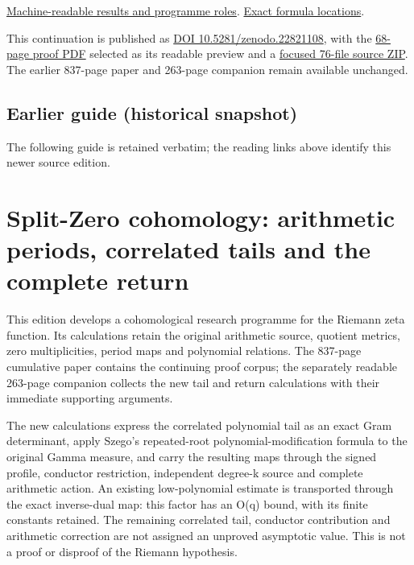 \documentclass[
]{article}
\begin{document}
\href{https://github.com/KokunoYumeto/zeta-function-research-reader/blob/main/workbenches/splitzero-tandem/continuations/20260918-conductor-covariance-attained-profile/research_index/PROGRAM_INDEX.json}{Machine-readable
results and programme roles}.
\href{https://github.com/KokunoYumeto/zeta-function-research-reader/blob/main/workbenches/splitzero-tandem/continuations/20260918-conductor-covariance-attained-profile/research_index/FORMULA_LOCATORS.json}{Exact
formula locations}.

This continuation is published as
\href{https://zenodo.org/records/22821108}{DOI 10.5281/zenodo.22821108},
with the
\href{https://zenodo.org/records/22821108/preview/95-splitzero-conductor-covariance-proof.pdf?include_deleted=0}{68-page
proof PDF} selected as its readable preview and a
\href{https://zenodo.org/api/records/22821108/files/96-splitzero-conductor-covariance-sources.zip/content}{focused
76-file source ZIP}. The earlier 837-page paper and 263-page companion
remain available unchanged.

\subsection{Earlier guide (historical
snapshot)}\label{earlier-guide-historical-snapshot-3}

The following guide is retained verbatim; the reading links above
identify this newer source edition.

\section{Split-Zero cohomology: arithmetic periods, correlated tails and
the complete
return}\label{split-zero-cohomology-arithmetic-periods-correlated-tails-and-the-complete-return}

This edition develops a cohomological research programme for the Riemann
zeta function. Its calculations retain the original arithmetic source,
quotient metrics, zero multiplicities, period maps and polynomial
relations. The 837-page cumulative paper contains the continuing proof
corpus; the separately readable 263-page companion collects the new tail
and return calculations with their immediate supporting arguments.

The new calculations express the correlated polynomial tail as an exact
Gram determinant, apply Szego's repeated-root polynomial-modification
formula to the original Gamma measure, and carry the resulting maps
through the signed profile, conductor restriction, independent degree-k
source and complete arithmetic action. An existing low-polynomial
estimate is transported through the exact inverse-dual map: this factor
has an O(q) bound, with its finite constants retained. The remaining
correlated tail, conductor contribution and arithmetic correction are
not assigned an unproved asymptotic value. This is not a proof or
disproof of the Riemann hypothesis.
\end{document}
